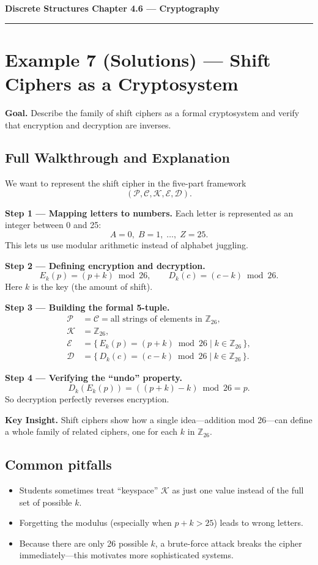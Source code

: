 \documentclass[12pt]{article}
\begin{document}
{\large \textbf{Discrete Structures \quad Chapter 4.6 — Cryptography}}

\hrule
\vspace{0.5em}

\section*{Example 7 (Solutions) — Shift Ciphers as a Cryptosystem}

\textbf{Goal.} Describe the family of shift ciphers as a formal cryptosystem and verify that encryption and decryption are inverses.

\subsection*{Full Walkthrough and Explanation}

We want to represent the shift cipher in the five-part framework
\[
(\mathcal{P}, \mathcal{C}, \mathcal{K}, \mathcal{E}, \mathcal{D}).
\]

\textbf{Step 1 — Mapping letters to numbers.}  
Each letter is represented as an integer between 0 and 25:
\[
A=0,\; B=1,\; \dots,\; Z=25.
\]
This lets us use modular arithmetic instead of alphabet juggling.

\textbf{Step 2 — Defining encryption and decryption.}
\[
E_k(p) = (p + k) \bmod 26, \qquad D_k(c) = (c - k) \bmod 26.
\]
Here $k$ is the key (the amount of shift).

\textbf{Step 3 — Building the formal 5-tuple.}
\[
\begin{aligned}
\mathcal{P} &= \mathcal{C} = \text{all strings of elements in } \mathbb{Z}_{26},\\
\mathcal{K} &= \mathbb{Z}_{26},\\
\mathcal{E} &= \{\,E_k(p) = (p + k)\bmod 26 \mid k \in \mathbb{Z}_{26}\,\},\\
\mathcal{D} &= \{\,D_k(c) = (c - k)\bmod 26 \mid k \in \mathbb{Z}_{26}\,\}.
\end{aligned}
\]

\textbf{Step 4 — Verifying the “undo” property.}
\[
D_k(E_k(p)) = ((p + k) - k)\bmod 26 = p.
\]
So decryption perfectly reverses encryption.

\textbf{Key Insight.}  
Shift ciphers show how a single idea—addition mod 26—can define a whole family of related ciphers, one for each $k$ in $\mathbb{Z}_{26}$.

\subsection*{Common pitfalls}
\begin{itemize}[leftmargin=1.5em]
  \item Students sometimes treat “keyspace” $\mathcal{K}$ as just one value instead of the full set of possible $k$.
  \item Forgetting the modulus (especially when $p+k>25$) leads to wrong letters.
  \item Because there are only 26 possible $k$, a brute-force attack breaks the cipher immediately—this motivates more sophisticated systems.
\end{itemize}
\end{document}
